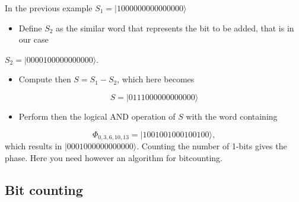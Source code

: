 \noindent
In the previous example $S_1=|1000000000000000\rangle$
\begin{itemize}
\item Define $S_2$ as the similar word that represents the bit to be added, that is in our case
\end{itemize}

\noindent
$S_2=|0000100000000000\rangle$.
\begin{itemize}
\item Compute then $S=S_1-S_2$, which here becomes
\end{itemize}

\noindent
\[
S=|0111000000000000\rangle
\]
\begin{itemize}
\item Perform then the logical AND operation of $S$ with the word containing 
\end{itemize}

\noindent
\[
\Phi_{0,3,6,10,13} = |1001001000100100\rangle,
\]
which results in $|0001000000000000\rangle$. Counting the number of 1-bits gives the phase.  Here you need however an algorithm for bitcounting.



\subsection*{Bit counting}

\paragraph{}

